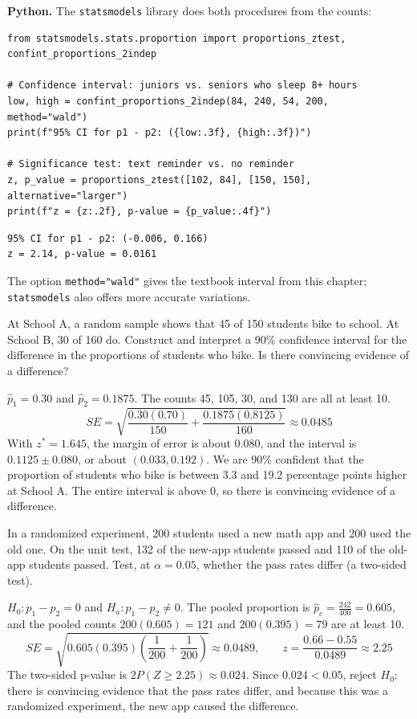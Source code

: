 \textbf{Python.} The \texttt{statsmodels} library does both procedures from the counts:
\begin{verbatim}
from statsmodels.stats.proportion import proportions_ztest, confint_proportions_2indep

# Confidence interval: juniors vs. seniors who sleep 8+ hours
low, high = confint_proportions_2indep(84, 240, 54, 200, method="wald")
print(f"95% CI for p1 - p2: ({low:.3f}, {high:.3f})")

# Significance test: text reminder vs. no reminder
z, p_value = proportions_ztest([102, 84], [150, 150], alternative="larger")
print(f"z = {z:.2f}, p-value = {p_value:.4f}")
\end{verbatim}
\begin{verbatim}
95% CI for p1 - p2: (-0.006, 0.166)
z = 2.14, p-value = 0.0161
\end{verbatim}
The option \texttt{method="wald"} gives the textbook interval from this chapter;
\texttt{statsmodels} also offers more accurate variations.

\begin{Exercise}[title={Biking to School}, label=tp_ci]
At School A, a random sample shows that 45 of 150 students bike to school. At School B, 30 of 160
do. Construct and interpret a 90\% confidence interval for the difference in the proportions of
students who bike. Is there convincing evidence of a difference?
\end{Exercise}
\begin{Answer}[ref=tp_ci]
$\hat{p}_1 = 0.30$ and $\hat{p}_2 = 0.1875$. The counts 45, 105, 30, and 130 are all at least 10.
$$SE = \sqrt{\frac{0.30(0.70)}{150} + \frac{0.1875(0.8125)}{160}} \approx 0.0485$$
With $z^* = 1.645$, the margin of error is about $0.080$, and the interval is
$0.1125 \pm 0.080$, or about $(0.033, 0.192)$. We are 90\% confident that the proportion of
students who bike is between 3.3 and 19.2 percentage points higher at School A. The entire
interval is above 0, so there is convincing evidence of a difference.
\end{Answer}

\begin{Exercise}[title={A New Math App}, label=tp_test]
In a randomized experiment, 200 students used a new math app and 200 used the old one. On the
unit test, 132 of the new-app students passed and 110 of the old-app students passed. Test, at
$\alpha = 0.05$, whether the pass rates differ (a two-sided test).
\end{Exercise}
\begin{Answer}[ref=tp_test]
$H_0: p_1 - p_2 = 0$ and $H_a: p_1 - p_2 \neq 0$. The pooled proportion is
$\hat{p}_c = \frac{242}{400} = 0.605$, and the pooled counts $200(0.605) = 121$ and $200(0.395) = 79$
are at least 10.
$$SE = \sqrt{0.605(0.395)\left(\frac{1}{200} + \frac{1}{200}\right)} \approx 0.0489, \qquad
z = \frac{0.66 - 0.55}{0.0489} \approx 2.25$$
The two-sided p-value is $2P(Z \geq 2.25) \approx 0.024$. Since $0.024 < 0.05$, reject $H_0$: there is
convincing evidence that the pass rates differ, and because this was a randomized experiment,
the new app caused the difference.
\end{Answer}

